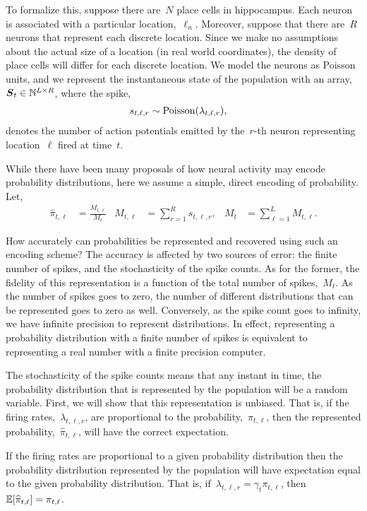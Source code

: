 To formalize this, suppose there are~$N$ place cells in
hippocampus. Each neuron is associated with a particular
location,~$\ell_n$. Moreover, suppose that there are~$R$ neurons that
represent each discrete location.  Since we make no assumptions about
the actual size of a location (in real world coordinates), the density
of place cells will differ for each discrete location.
We model the neurons as Poisson units, and we represent the instantaneous 
state of the population with an array,~${\boldsymbol{S}_t \in \mathbb{N}^{L \times R}}$,
where the  spike,
\begin{align}
s_{t,\ell,r} &\sim \mathrm{Poisson}(\lambda_{t, \ell, r}),
\end{align} denotes the number of action potentials
emitted by the~$r$-th neuron
representing location~$\ell$ fired at time~$t$.

While there have been many proposals of how neural activity may encode
probability distributions, here we assume a simple, direct encoding of
probability. Let,
\begin{align}
  \label{eq:pr_rep}
  \widehat{\pi}_{t, \ell} &= \frac{M_{t, \ell}}{M_t} &
  M_{t,\ell} &= \sum_{r=1}^R s_{t,\ell,r}, &
  M_t &= \sum_{\ell=1}^L M_{t,\ell}.
\end{align}

How accurately can probabilities be represented and recovered using 
such an encoding scheme? The accuracy is affected by two sources of error: 
the finite number of spikes, and the stochasticity of the spike 
counts. As for the former, the fidelity of this representation 
is a function of the total number of spikes,~$M_t$. As the number 
of spikes goes to zero, the number of different distributions that 
can be represented goes to zero as well. Conversely, as the spike 
count goes to infinity, we have infinite precision to represent 
distributions. In effect, representing a probability distribution 
with a finite number of spikes is equivalent to representing a 
real number with a finite precision computer. 

The stochasticity of the spike counts means that any instant in 
time, the probability distribution that is represented by the population will 
be a random variable.  First, we will show that this representation 
is unbiased. That is, if the firing rates,~$\lambda_{t, \ell, r}$, 
are proportional to the probability,~$\pi_{t,\ell}$, then the 
represented probability,~$\widehat{\pi}_{t, \ell}$, will have the  
correct expectation.

\begin{lemma}
\label{lem:consistency}
If the firing rates are proportional to a given
probability distribution then the probability distribution represented by the 
population will have expectation equal to the given probability distribution.
That is, if~$\lambda_{t, \ell, r}=\gamma_t \pi_{t,\ell}$, 
then~$\mathbb{E}[\widehat{\pi}_{t,\ell}] = \pi_{t,\ell}$.
\end{lemma}

